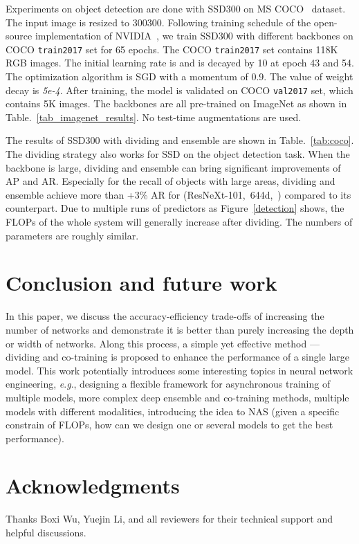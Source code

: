 \documentclass[lettersize,journal]{IEEEtran}
\newcommand{\eg}{\textit{e}.\textit{g}.}
\begin{document}
Experiments on object detection are done with SSD300 on MS COCO~\cite{2014_COCO} dataset.
The input image is resized to 300300.
Following training schedule of the open-source implementation
of NVIDIA~\cite{2020_deeplearningexamples},
we train SSD300 with different backbones on COCO \texttt{train2017} set
for 65 epochs.
The COCO \texttt{train2017} set contains 118K RGB images.
The initial learning rate is  and is decayed by 10 at epoch 43 and 54.
The optimization algorithm is SGD with a momentum of 0.9.
The value of weight decay is \textit{5e-4}.
After training, the model is validated on COCO \texttt{val2017} set,
which contains 5K images.
The backbones are all pre-trained on ImageNet as shown in 
Table.~\ref{tab_imagenet_results}.
No test-time augmentations are used.


The results of SSD300 with dividing and ensemble are shown in Table.~\ref{tab:coco}.
The dividing strategy also works for SSD on the object detection task.
When the backbone is large, dividing and ensemble can bring significant improvements of
AP and AR. Especially for the recall of objects with large areas,
dividing and ensemble achieve more than +3\% AR for (ResNeXt-101,~644d,~)
compared to its counterpart.
Due to multiple runs of predictors as Figure~\ref{detection} shows,
the FLOPs of the whole system will generally increase after dividing.
The numbers of parameters are roughly similar.


\section{Conclusion and future work}
\noindent
In this paper,
we discuss the accuracy-efficiency trade-offs
of increasing the number of networks and demonstrate
it is better than purely increasing the depth or width of networks.
Along this process, a simple yet effective method ---
dividing and co-training is proposed to enhance the performance
of a single large model.
This work potentially introduces some interesting topics in neural network
engineering, \eg,
designing a flexible framework for asynchronous training of multiple models,
more complex deep ensemble and co-training methods,
multiple models with different modalities, introducing the idea to NAS
(given a specific constrain of FLOPs,
how can we design one or several models to get the best performance).


\section*{Acknowledgments}
Thanks Boxi Wu, Yuejin Li, and all reviewers
for their technical support and helpful discussions.
\end{document}
